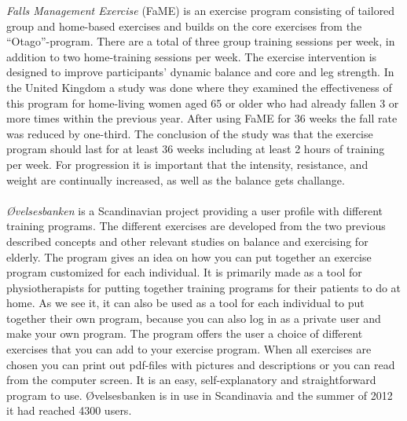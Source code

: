 \emph{Falls Management Exercise} (FaME) is an exercise program consisting of tailored group and home-based exercises and builds on the core exercises from the “Otago”-program.  There are a total of three group training sessions per week, in addition to two home-training sessions per week. The exercise intervention is designed to improve participants’ dynamic balance and core and leg strength.  In the United Kingdom a study was done where they examined the effectiveness of this program for home-living women aged 65 or older who had already fallen 3 or more times within the previous year. After using FaME for 36 weeks the fall rate was reduced by one-third. The conclusion of the study was that the exercise program should last for at least 36 weeks including at least 2 hours of training per week. For progression it is important that the intensity, resistance, and weight are continually increased, as well as the balance gets challange.\cite{fame}\\ \\
\emph{{Ø}velsesbanken} is a Scandinavian project providing a user profile with different training programs. The different exercises are developed from the two previous described concepts and other relevant studies on balance and exercising for elderly. The program gives an idea on how you can put together an exercise program customized for each individual. It is primarily made as a tool for physiotherapists for putting together training programs for their patients to do at home. As we see it, it can also be used as a tool for each individual to put together their own program, because you can also log in as a private user and make your own program. The program offers the user a choice of different exercises that you can add to your exercise program. When all exercises are chosen you can print out pdf-files with pictures and descriptions or you can read from the computer screen. It is an easy, self-explanatory and straightforward program to use. {Ø}velsesbanken is in use in Scandinavia and the summer of 2012 it had reached 4300 users. \cite{ovelsesbank}\\ \\
